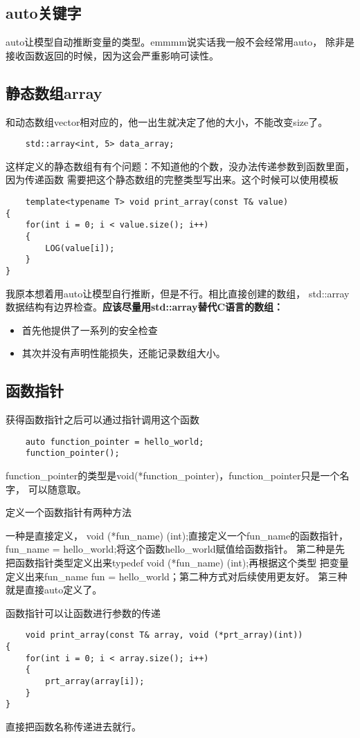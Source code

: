 \documentclass{article}
\begin{document}
\begin{sloppypar}
\subsection{auto关键字}
auto让模型自动推断变量的类型。emmmm说实话我一般不会经常用auto，
除非是接收函数返回的时候，因为这会严重影响可读性。

\subsection{静态数组array}
和动态数组vector相对应的，他一出生就决定了他的大小，不能改变size了。
\begin{lstlisting}
	std::array<int, 5> data_array;
\end{lstlisting}
这样定义的静态数组有有个问题：不知道他的个数，没办法传递参数到函数里面，因为传递函数
需要把这个静态数组的完整类型写出来。这个时候可以使用模板
\begin{lstlisting}
	template<typename T> void print_array(const T& value) 
{
    for(int i = 0; i < value.size(); i++)
    {
        LOG(value[i]);
    }
}
\end{lstlisting}
我原本想着用auto让模型自行推断，但是不行。相比直接创建的数组，
std::array数据结构有边界检查。\textbf{应该尽量用std::array替代C语言的数组：}
\begin{itemize}
	\item 首先他提供了一系列的安全检查
	\item 其次并没有声明性能损失，还能记录数组大小。
\end{itemize}

\subsection{函数指针}
获得函数指针之后可以通过指针调用这个函数
\begin{lstlisting}
	auto function_pointer = hello_world;
    function_pointer();
\end{lstlisting}
function\_pointer的类型是void(*function\_pointer)，function\_pointer只是一个名字，
可以随意取。

定义一个函数指针有两种方法
\begin{outline}
	\1 一种是直接定义，    void (*fun\_name) (int);直接定义一个fun\_name的函数指针，
    fun\_name = hello\_world;将这个函数hello\_world赋值给函数指针。
	\1 第二种是先把函数指针类型定义出来typedef void (*fun\_name) (int);再根据这个类型
	把变量定义出来fun\_name fun = hello\_world；第二种方式对后续使用更友好。
	\1 第三种就是直接auto定义了。
\end{outline}
函数指针可以让函数进行参数的传递
\begin{lstlisting}
	void print_array(const T& array, void (*prt_array)(int))
{
    for(int i = 0; i < array.size(); i++)
    {
        prt_array(array[i]);
    }
}
\end{lstlisting}
直接把函数名称传递进去就行。


\end{sloppypar}
\end{document}

